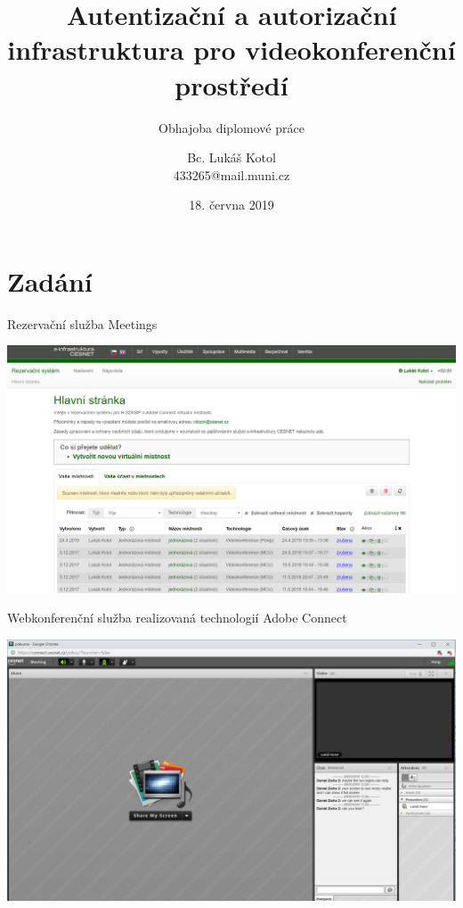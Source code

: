 \documentclass[
]{beamer}
\begin{document}
\title[Obhajoba diplomové práce]{Autentizační a autorizační infrastruktura pro videokonferenční prostředí}
\subtitle[Short Presentation Subtitle]{Obhajoba diplomové práce}
\author[L.\,Kotol]{Bc. Lukáš Kotol \\ 433265@mail.muni.cz}
\date{18. června 2019}
\subject{Presentation Subject}

\begin{frame}[plain]
\maketitle
\end{frame}

\section[Zadání]{Zadání}

\begin{frame}{Rezervační služba Meetings}

\includegraphics[width=\textwidth]{pics/rezervacni_system}
\end{frame}

\begin{frame}{Webkonferenční služba realizovaná technologií Adobe Connect}

\includegraphics[width=\textwidth]{pics/adobe_connect.PNG}
\end{frame}
\end{document}
